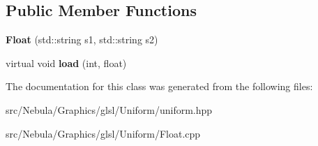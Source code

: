 \subsection*{\-Public \-Member \-Functions}
\begin{DoxyCompactItemize}
\item 
\hypertarget{classNeb_1_1glsl_1_1Uniform_1_1Vector_1_1Float_a79fa9f7bd948d86a054e5ab2bd0f4e40}{{\bfseries \-Float} (std\-::string s1, std\-::string s2)}\label{classNeb_1_1glsl_1_1Uniform_1_1Vector_1_1Float_a79fa9f7bd948d86a054e5ab2bd0f4e40}

\item 
\hypertarget{classNeb_1_1glsl_1_1Uniform_1_1Vector_1_1Float_a9a71da7e73a83c7e3f8d243a994bf4b8}{virtual void {\bfseries load} (int, float)}\label{classNeb_1_1glsl_1_1Uniform_1_1Vector_1_1Float_a9a71da7e73a83c7e3f8d243a994bf4b8}

\end{DoxyCompactItemize}


\-The documentation for this class was generated from the following files\-:\begin{DoxyCompactItemize}
\item 
src/\-Nebula/\-Graphics/glsl/\-Uniform/uniform.\-hpp\item 
src/\-Nebula/\-Graphics/glsl/\-Uniform/\-Float.\-cpp\end{DoxyCompactItemize}
